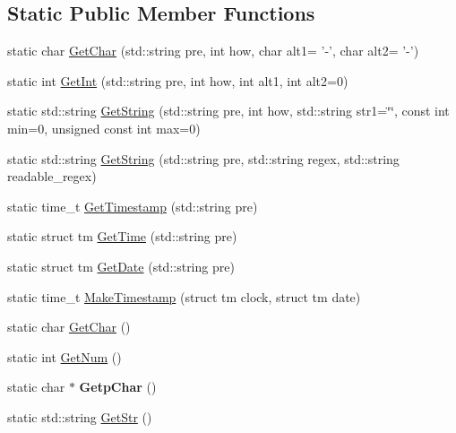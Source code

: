 \subsection*{Static Public Member Functions}
\begin{DoxyCompactItemize}
\item 
static char \hyperlink{classuserio_a4b9f8afe7fb2bd76f5266a684cd20d04}{Get\-Char} (std\-::string pre, int how, char alt1= '-\/', char alt2= '-\/')
\item 
static int \hyperlink{classuserio_a1c7d7816b8685f249f6cdb9daf524730}{Get\-Int} (std\-::string pre, int how, int alt1, int alt2=0)
\item 
static std\-::string \hyperlink{classuserio_ae31f1f0b7982933a8c9ac5ac683b7450}{Get\-String} (std\-::string pre, int how, std\-::string str1=\char`\"{}\char`\"{}, const int min=0, unsigned const int max=0)
\item 
static std\-::string \hyperlink{classuserio_a8cce5c74bcb42130d51d28dca9cca56c}{Get\-String} (std\-::string pre, std\-::string regex, std\-::string readable\-\_\-regex)
\item 
static time\-\_\-t \hyperlink{classuserio_ad764988b25a5491ff4d09f096aaa3e36}{Get\-Timestamp} (std\-::string pre)
\item 
static struct tm \hyperlink{classuserio_ad89aefb694383c172e04af7efb2a96fa}{Get\-Time} (std\-::string pre)
\item 
static struct tm \hyperlink{classuserio_a29176550beb6b7abf9d9a6093a2fc484}{Get\-Date} (std\-::string pre)
\item 
static time\-\_\-t \hyperlink{classuserio_a815f7bcecc23024e5b2e7a2584f13222}{Make\-Timestamp} (struct tm clock, struct tm date)
\item 
static char \hyperlink{classuserio_a9628539a58d68f72ca969d4e56a20fd7}{Get\-Char} ()
\item 
static int \hyperlink{classuserio_aa27b9bea4db93f6c323bd3124e6cebb2}{Get\-Num} ()
\item 
\hypertarget{classuserio_a53cc662c35b86ddc0ceb3b3f490621bb}{static char $\ast$ {\bfseries Getp\-Char} ()}\label{dc/ddf/classuserio_a53cc662c35b86ddc0ceb3b3f490621bb}

\item 
static std\-::string \hyperlink{classuserio_a4bcb13a6da031a044765003a310b9df5}{Get\-Str} ()
\end{DoxyCompactItemize}


